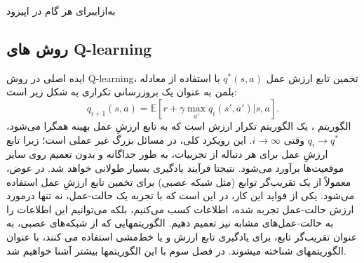 \‌به‌ازای{برای هر گام در اپیزود}
\subsection{روش های Q-learning}
ایده اصلی در روش 
Q-learning،
 تخمین تابع ارزش عمل  
$q^*(s,a)$ 
با استفاده از معادله بلمن به عنوان یک بروزرسانی تکراری به شکل زیر است:
$$q_{i+1}(s,a) = \mathbb{E}[r+ \gamma \max_{a'} q_i(s',a')|s,a].$$
الگوریتم 
،
یک الگوریتم تکرار ارزش است که به تابع ارزشِ عمل بهینه همگرا می‌شود، 
$q_i \longrightarrow q^*$
وقتی
$i \longrightarrow \infty$.
این رویکرد کلی، در مسائل بزرگ غیر عملی است؛
زیرا تابع ارزشِ عمل برای هر دنباله از تجربیات،  به طور جداگانه و بدون تعمیم روی سایر موقعیت‌ها برآورد می‌شود. نتیجتا فرآیند یادگیری بسیار طولانی خواهد شد. در عوض، معمولاً از یک تقریب‌گر توابع (مثل شبکه عصبی) برای تخمین تابع ارزشِ عمل استفاده می‌شود.  یکی از فواید این کار، در این است که با تجربه یک حالت-عمل، نه تنها درمورد ارزش حالت-عمل تجربه شده، اطلاعات کسب می‌کنیم، بلکه می‌توانیم این اطلاعات را به حالت-عمل‌های مشابه نیز تعمیم دهیم.
الگوریتم\nf هایی که از شبکه‌های عصبی، به عنوان تقریب‌گر تابع، برای یادگیری تابع ارزش و یا خط‌مشی استفاده می کنند، با عنوان الگوریتم\nf های 
\textit{}
شناخته می\nf شوند. در فصل سوم با این الگوریتم\nf ها بیشتر آشنا خواهیم شد.
